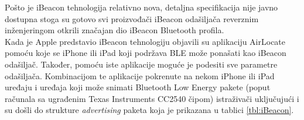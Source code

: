 Pošto je iBeacon tehnologija relativno nova, detaljna specifikacija nije javno dostupna stoga su gotovo svi proizvođači iBeacon odašiljača reverznim inženjeringom otkrili značajan dio iBeacon Bluetooth profila.
\\
Kada je Apple predstavio iBeacon tehnologiju objavili su aplikaciju AirLocate pomoću koje se iPhone ili iPad koji podržava BLE može ponašati kao iBeacon odašiljač. 
Također, pomoću iste aplikacije moguće je podesiti sve parametre odašiljača. 
Kombinacijom te aplikacije pokrenute na nekom iPhone ili iPad uređaju i uređaja koji može snimati Bluetooth Low Energy pakete (poput računala sa ugrađenim Texas Instruments CC2540 čipom) istraživači uključujući i \citep
{radiusReverseEng} su došli do strukture \textit{advertising} paketa koja je prikazana u tablici \ref{tbl:iBeacon}.

